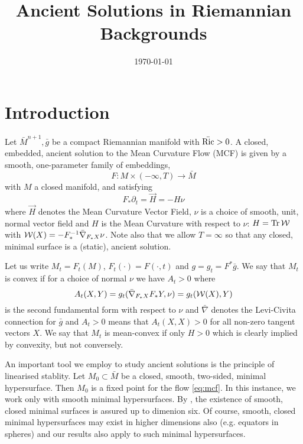 \documentclass{amsart}
\begin{document}
\title[Ancient Solutions]
 {Ancient Solutions in Riemannian Backgrounds}

\curraddr{}
\email{}
\date{\today}

\dedicatory{}
\subjclass[2010]{}
\keywords{}

\begin{abstract}
\end{abstract}

\maketitle

\section{Introduction}
\label{sec:intro}

Let \(\bar{M}^{n+1}, \bar{g}\) be a compact Riemannian manifold with \(\bar{\operatorname{Ric}} > 0\). A closed, embedded, ancient solution to the Mean Curvature Flow (MCF) is given by a smooth, one-parameter family of embeddings,
\[
F : M \times (-\infty, T) \to \bar{M}
\]
with \(M\) a closed manifold, and satisfying
\begin{equation}
\label{eq:mcf}
F_{\ast} \partial_t = \vec{H} = -H\nu
\end{equation}
where \(\vec{H}\) denotes the Mean Curvature Vector Field, \(\nu\) is a choice of smooth, unit, normal vector field and \(H\) is the Mean Curvature with respect to \(\nu\): \(H = \operatorname{Tr} \operatorname{\mathcal{W}}\) with \(\operatorname{\mathcal{W}} (X) = -F_{\ast}^{-1} \bar{\nabla}_{F_{\ast} X} \nu\). Note also that we allow \(T = \infty\) so that any closed, minimal surface is a (static), ancient solution.

Let us write \(M_t = F_t(M)\), \(F_t (\cdot) = F(\cdot, t)\) and \(g = g_t = F^{\ast} \bar{g}\). We say that \(M_t\) is convex if for a choice of normal \(\nu\) we have \(A_t>0\) where
\[
A_t (X, Y) = g_t (\bar{\nabla}_{F_{\ast} X} F_{\ast} Y, \nu) = g_t(\operatorname{\mathcal{W}}(X), Y)
\]
is the second fundamental form with respect to \(\nu\) and \(\bar{\nabla}\) denotes the Levi-Civita connection for \(\bar{g}\) and \(A_t > 0\) means that \(A_t(X, X) > 0\) for all non-zero tangent vectors \(X\). We say that \(M_t\) is mean-convex if only \(H > 0\) which is clearly implied by convexity, but not conversely.

An important tool we employ to study ancient solutions is the principle of linearised stablity. Let \(M_0 \subset \bar{M}\) be a closed, smooth, two-sided, minimal hypersurface. Then \(M_0\) is a fixed point for the flow \eqref{eq:mcf}. In this instance, we work only with smooth minimal hypersurfaces. By \cite{pitts:/1983}, the existence of smooth, closed minimal surfaces is assured up to dimenion six. Of course, smooth, closed minimal hypersurfaces may exist in higher dimensions also (e.g. equators in spheres) and our results also apply to such minimal hypersurfaces.
\end{document}
